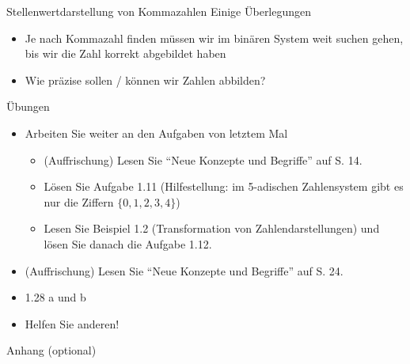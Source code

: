 \begin{frame}{Stellenwertdarstellung von Kommazahlen}
Einige Überlegungen
\begin{itemize}
    \item Je nach Kommazahl finden müssen wir im binären System weit suchen gehen, bis wir die Zahl korrekt abgebildet haben
    \item Wie präzise sollen / können wir Zahlen abbilden?
\end{itemize}
\end{frame}

\begin{frame}{Übungen}
\begin{itemize}
    \item Arbeiten Sie weiter an den Aufgaben von letztem Mal
    \begin{itemize}
        \item (Auffrischung) Lesen Sie \enquote{Neue Konzepte und Begriffe} auf S. 14.
        \item Lösen Sie Aufgabe 1.11 (Hilfestellung: im 5-adischen Zahlensystem gibt es nur die Ziffern $\{0,1,2,3,4\}$)
        \item Lesen Sie Beispiel 1.2 (Transformation von Zahlendarstellungen) und lösen Sie danach die Aufgabe 1.12.
    \end{itemize}
    \item (Auffrischung) Lesen Sie \enquote{Neue Konzepte und Begriffe} auf S. 24.
    \item 1.28 a und b
    \item Helfen Sie anderen!
\end{itemize}
\end{frame}

\begin{frame}{Anhang (optional)}
\end{frame}

